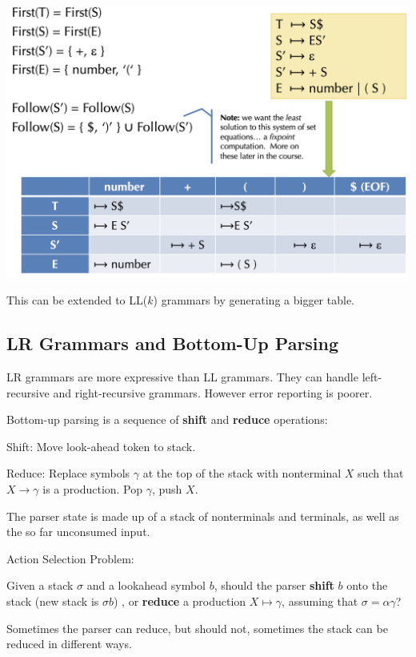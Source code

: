 \begin{center}
	\includegraphics[width=\linewidth]{assets/ll1.png}
\end{center}

This can be extended to LL($k$) grammars by generating a bigger table.


\subsection*{LR Grammars and Bottom-Up Parsing}

LR grammars are more expressive than LL grammars. They can handle left-recursive and right-recursive grammars. However error reporting is poorer. \medskip

Bottom-up parsing is a sequence of \textbf{shift} and \textbf{reduce} operations:
\begin{compactitem}
	\item Shift: Move look-ahead token to stack.
	
	\item Reduce: Replace symbols $\gamma$ at the top of the stack with nonterminal $X$ such that $X \to \gamma$ is a production. Pop $\gamma$, push $X$.
\end{compactitem}

The parser state is made up of a stack of nonterminals and terminals, as well as the so far unconsumed input.\medskip
			
Action Selection Problem:
\begin{compactitem}
	\item Given a stack $\sigma$ and a lookahead symbol $b$, should the parser \textbf{shift} $b$ onto the stack (new stack is $\sigma b$) , or \textbf{reduce} a production $X \mapsto \gamma$, assuming that $\sigma = \alpha \gamma$?
	
	\item Sometimes the parser can reduce, but should not, sometimes the stack can be reduced in different ways.
\end{compactitem}

